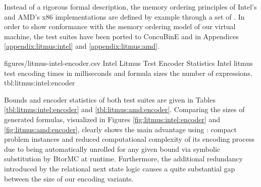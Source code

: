 Instead of a rigorous formal description, the memory ordering principles of Intel's \cite{ref:Intel} and AMD's \cite{ref:AMD} x86 implementations are defined by example through a set of .
In order to show conformance with the memory ordering model of our virtual machine, the test suites have been ported to ConcuBinE and  in Appendices \ref{appendix:litmus:intel} and \ref{appendix:litmus:amd}.



\newcommand{\IntelRowHeader}[1]{\hyperref[tbl:litmus:intel:#1]{#1}}
\newcommand{\AMDRowHeader}[1]{\hyperref[tbl:litmus:amd:#1]{#1}}

\EncoderStatsTable
  {figures/litmus-intel-encoder.csv}
  {\textnumero}
  {\IntelRowHeader}
  {Intel Litmus Test Encoder Statistics}
  {Intel litmus test encoding times in milliseconds and formula sizes  the number of expressions.}
  {tbl:litmus:intel:encoder}


Bounds and encoder statistics of both test suites are given in Tables \ref{tbl:litmus:intel:encoder} and \ref{tbl:litmus:amd:encoder}.
Comparing the sizes of generated formulas, visualized in Figures \ref{fig:litmus:intel:encoder} and \ref{fig:litmus:amd:encoder}, clearly shows the main advantage  using {\BTOR}:
compact problem instances and reduced computational complexity of its encoding process
due to being automatically unrolled for any given bound via symbolic substitution by BtorMC at runtime.
Furthermore, the additional redundancy introduced by the relational next state logic causes a quite substantial gap between the size of our {\SMTLIB} encoding variants.

